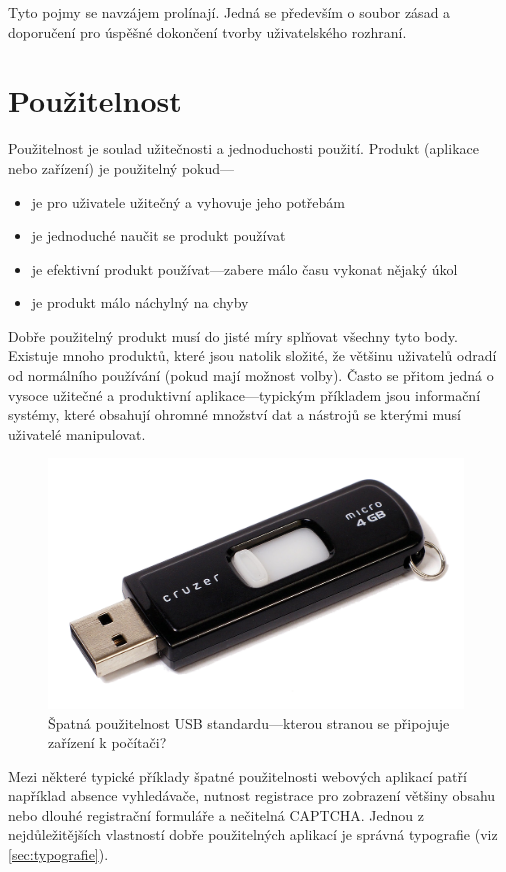 Tyto pojmy se navzájem prolínají. Jedná se především o soubor zásad a doporučení pro úspěšné dokončení tvorby uživatelského rozhraní.

\section{Použitelnost}
\label{sec:usability}

Použitelnost je soulad užitečnosti a jednoduchosti použití. Produkt (aplikace nebo zařízení) je použitelný pokud---

\begin{itemize}
    \item je pro uživatele užitečný a vyhovuje jeho potřebám
    \item je jednoduché naučit se produkt používat
    \item je efektivní produkt používat---zabere málo času vykonat nějaký úkol
    \item je produkt málo náchylný na chyby
\end{itemize}

Dobře použitelný produkt musí do jisté míry splňovat všechny tyto body. Existuje mnoho produktů, které jsou natolik složité, že většinu uživatelů odradí od normálního používání (pokud mají možnost volby). Často se přitom jedná o vysoce užitečné a produktivní aplikace---typickým příkladem jsou informační systémy, které obsahují ohromné množství dat a nástrojů se kterými musí uživatelé manipulovat.

\begin{figure}[htbp]
    \centering
    \includegraphics[width=11cm]{images/usb-fail.png}
    \caption{Špatná použitelnost USB standardu---kterou stranou se připojuje zařízení k počítači?}
\end{figure}

Mezi některé typické příklady špatné použitelnosti webových aplikací patří například absence vyhledávače, nutnost registrace pro zobrazení většiny obsahu nebo dlouhé registrační formuláře a nečitelná CAPTCHA. Jednou z nejdůležitějších vlastností dobře použitelných aplikací je správná typografie (viz \ref{sec:typografie}).

